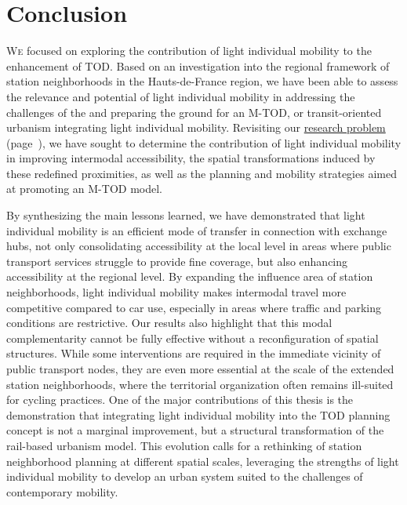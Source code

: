 \renewcommand{\thefigure}{C.\arabic{figure}} %
\renewcommand{\thetable}{C.\arabic{table}}
\setcounter{figure}{0}
\setcounter{table}{0}

\part*{Conclusion}
    \label{body:conclusion-generale}
    \begin{refsegment}

\lettrine[lines=3, findent=8pt, nindent=0pt]{ W}{e} focused on exploring the contribution of light individual mobility to the enhancement of \acrshort{TOD}. Based on an investigation into the regional framework of station neighborhoods in the Hauts-de-France region, we have been able to assess the relevance and potential of light individual mobility in addressing the challenges of the  and preparing the ground for an \acrfull{M-TOD}, or transit-oriented urbanism integrating light individual mobility. Revisiting our \hyperref[introduction-generale:problematique-objectifs-hypotheses]{research problem} (page~\pageref{introduction-generale:problematique-objectifs-hypotheses}), we have sought to determine the contribution of light individual mobility in improving \gls{intermodal accessibility}, the spatial transformations induced by these redefined proximities, as well as the planning and mobility strategies aimed at promoting an \acrshort{M-TOD} model.%

By synthesizing the main lessons learned, we have demonstrated that light individual mobility is an efficient mode of transfer in connection with exchange hubs, not only consolidating \gls{accessibility} at the local level in areas where \gls{public transport} services struggle to provide fine coverage, but also enhancing accessibility at the regional level. By expanding the influence area of station neighborhoods, light individual mobility makes intermodal travel more competitive compared to car use, especially in areas where traffic and parking conditions are restrictive. Our results also highlight that this modal complementarity cannot be fully effective without a reconfiguration of spatial structures. While some interventions are required in the immediate vicinity of public transport nodes, they are even more essential at the scale of the extended station neighborhoods, where the territorial organization often remains ill-suited for cycling practices. One of the major contributions of this thesis is the demonstration that integrating light individual mobility into the \acrshort{TOD} planning concept is not a marginal improvement, but a structural transformation of the rail-based urbanism model. This evolution calls for a rethinking of station neighborhood planning at different spatial scales, leveraging the strengths of light individual mobility to develop an urban system suited to the challenges of contemporary mobility.%


\end{refsegment}
